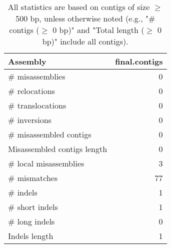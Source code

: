 \documentclass[12pt,a4paper]{article}
\begin{document}
\begin{table}[ht]
\begin{center}
\caption{All statistics are based on contigs of size $\geq$ 500 bp, unless otherwise noted (e.g., "\# contigs ($\geq$ 0 bp)" and "Total length ($\geq$ 0 bp)" include all contigs).}
\begin{tabular}{|l*{1}{|r}|}
\hline
Assembly & final.contigs \\ \hline
\# misassemblies & 0 \\ \hline
\hspace{5mm}\# relocations & 0 \\ \hline
\hspace{5mm}\# translocations & 0 \\ \hline
\hspace{5mm}\# inversions & 0 \\ \hline
\# misassembled contigs & 0 \\ \hline
Misassembled contigs length & 0 \\ \hline
\# local misassemblies & 3 \\ \hline
\# mismatches & 77 \\ \hline
\# indels & 1 \\ \hline
\hspace{5mm}\# short indels & 1 \\ \hline
\hspace{5mm}\# long indels & 0 \\ \hline
Indels length & 1 \\ \hline
\end{tabular}
\end{center}
\end{table}
\end{document}
